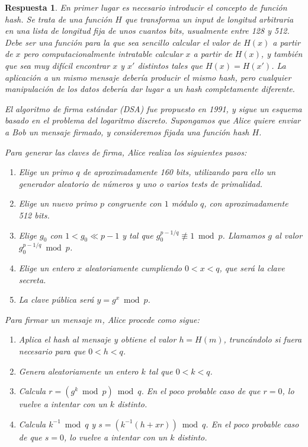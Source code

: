 \documentclass[
  a4paper,
  spanish,
  12pt,
]{scrartcl}
\theoremstyle{ejercicio-style}
\theoremstyle{remark-style}
\newtheorem*{sol}{Respuesta}
\theoremstyle{teorema-style}
\begin{document}
\begin{sol}
  En primer lugar es necesario introducir el concepto de \textit{función hash}. Se trata de una función $H$ que transforma un \textit{input} de longitud arbitraria en una lista de longitud fija de unos cuantos bits, usualmente entre 128 y 512. Debe ser una función para la que sea sencillo calcular el valor de $H(x)$ a partir de $x$ pero computacionalmente intratable calcular $x$ a partir de $H(x)$, y también que sea muy difícil encontrar $x$ y $x'$ distintos tales que $H(x)=H(x')$. La aplicación a un mismo mensaje debería producir el mismo \textit{hash}, pero cualquier manipulación de los datos debería dar lugar a un \textit{hash} completamente diferente.

  El algoritmo de firma estándar (DSA) fue propuesto en 1991, y sigue un esquema basado en el problema del logaritmo discreto. Supongamos que Alice quiere enviar a Bob un mensaje firmado, y consideremos fijada una función hash $H$.

  Para generar las claves de firma, Alice realiza los siguientes pasos:

  \begin{enumerate}
    \item Elige un primo $q$ de aproximadamente 160 bits, utilizando para ello un generador aleatorio de números y uno o varios tests de primalidad.
    \item Elige un nuevo primo $p$ congruente con $1$ módulo $q$, con aproximadamente 512 bits.
    \item Elige $g_0$ con $1 < g_0 \ll p-1$ y tal que $g_0 ^{p-1/q} \not\equiv 1 \bmod p$. Llamamos $g$ al valor  $g_0 ^{p-1/q} \bmod p$.
    \item Elige un entero $x$ aleatoriamente cumpliendo $0 < x < q$, que será la clave secreta.
    \item La clave pública será $y = g^x \bmod p$.
  \end{enumerate}

  Para firmar un mensaje $m$, Alice procede como sigue:
  \begin{enumerate}
    \item Aplica el hash al mensaje y obtiene el valor $h = H(m)$, truncándolo si fuera necesario para que $0 < h < q$.
    \item Genera aleatoriamente un entero $k$ tal que $0 < k < q$.
    \item Calcula $r=(g^k \bmod p) \bmod q$. En el poco probable caso de que $r=0$, lo vuelve a intentar con un $k$ distinto.
    \item Calcula $k^{-1} \bmod q$ y $s = (k^{-1}(h + xr)) \bmod q$. En el poco probable caso de que $s=0$, lo vuelve a intentar con un $k$ distinto.
  \end{enumerate}


\end{sol}
\end{document}
